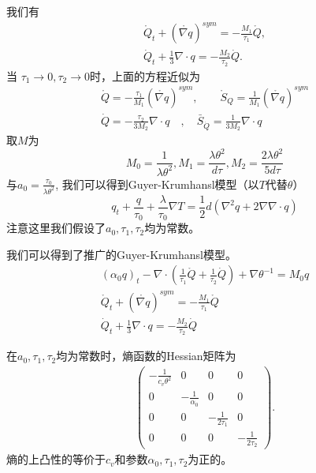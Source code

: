 \documentclass{article}
\begin{document}
我们有
\begin{eqnarray*}
\mathring{{Q}}_t+(\mathring{\nabla {q}})^{sym}=-\frac{M_1}{\tau_1}\mathring{{Q}}, \\
\dot{Q}_t+\frac{1}{3} \nabla \cdot {q}=-\frac{M_2}{\tau_2}\dot{Q}.
\end{eqnarray*}
当 $\tau_1 \to 0, \tau_2 \to 0$时，上面的方程近似为
\begin{eqnarray*} 
\mathring{{Q}}=-\frac{\tau_1}{M_1}(\mathring{\nabla {q}})^{sym} ,\quad  \quad \mathring{S}_{Q}=\frac{1}{M_1}(\mathring{\nabla {q}})^{sym} \\
\dot{Q}=-\frac{\tau_2}{3M_2}\nabla \cdot {q} \quad , \quad \bar{S}_{\dot{Q}}=\frac{1}{3M_2} \nabla \cdot {q}
\end{eqnarray*}
取$M$为
\begin{equation}
M_0=\frac{1}{\lambda \theta^2}, M_1=\frac{\lambda \theta^2}{d\tau}, M_2=\frac{2\lambda \theta^2}{5d\tau}
\end{equation}
与$a_0=\frac{\tau_0}{\lambda \theta^2}$,
我们可以得到Guyer-Krumhansl模型（以$T$代替$\theta$）\cite{Jou1996extended}
\begin{equation}
{q}_t+\frac{{q}}{\tau_0}+\frac{\lambda}{\tau_0}\nabla T=\frac{1}{2}d(\nabla^2 {q}+2\nabla \nabla \cdot {q})
\end{equation}
注意这里我们假设了$a_0,\tau_1,\tau_2$均为常数。

我们可以得到了推广的Guyer-Krumhansl模型。
\begin{subequations}
	\begin{align}
(\alpha_0 {q})_t - \nabla \cdot ({\frac{1}{\tau_1} \mathring{{Q}}}+\frac{1}{\tau_2}\dot{Q})+\nabla \theta^{-1} = M_0 {q} \\
\mathring{{Q}}_t+(\mathring{\nabla {q}})^{sym}=-\frac{M_1}{\tau_1}\mathring{{Q}} \\
\dot{Q}_t+\frac{1}{3} \nabla \cdot {q}=-\frac{M_2}{\tau_2} \dot{Q}
	\end{align}
\end{subequations}

在$a_0,\tau_1,\tau_2$均为常数时，熵函数的Hessian矩阵为
\begin{eqnarray*}
\left(\begin{array}{llll}  -\frac{1}{c_v \theta^2} & 0 & 0 & 0 \\
                                           0  & -\frac{1}{\alpha_0} & 0 & 0 \\
										   0 & 0 & -\frac{1}{2\tau_1} & 0 \\
										   0 & 0 & 0 & -\frac{1}{2\tau_2}
										   \end{array} \right).
\end{eqnarray*}
熵的上凸性的等价于$c_v$和参数$\alpha_0,\tau_1,\tau_2$为正的。
\end{document}
